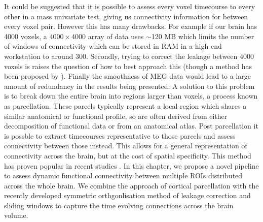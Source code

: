 It could be suggested that it is possible to assess every voxel timecourse to every other in a mass univariate test, giving us connectivity information for between every voxel pair. However this has many drawbacks. For example if our brain has 4000 voxels, a $4000 \times 4000$ array of data uses $\sim$120 MB which limits the number of windows of connectivity which can be stored in RAM in a high-end workstation to around 300. Secondly, trying to correct the leakage between 4000 voxels is raises the question of how to best approach this (though a method has been proposed by \citep{Maldjian2014}). Finally the smoothness of MEG data would lead to a large amount of redundancy in the results being presented. A solution to this problem is to break down the entire brain into regions larger than voxels, a process known as parcellation. These parcels typically represent a local region which shares a similar anatomical or functional profile, so are often derived from either decomposition of functional data or from an anatomical atlas. Post parcellation it is possble to extract timecourses representative to those parcels and assess connectivity between those instead. This allows for a general representation of connectivity across the brain, but at the cost of spatial specificity. This method has proven popular in recent studies \citep{Allen2014,Bola2015,Colclough2015,Finn2015,Hassan2015,Hillebrand2012,Smith2015,Tewarie2014a}. In this chapter, we propose a novel pipeline to assess dynamic functional connectivity between multiple ROIs distributed across the whole brain. We combine the approach of cortical parcellation with the recently developed symmetric orthgonlisation \citep{Colclough2015} method of leakage correction and sliding windows to capture the time evolving connections across the brain volume. 

